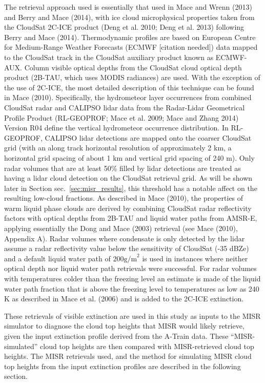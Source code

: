 The retrieval approach used is essentially that used in Mace and Wrenn
(2013) and Berry and Mace (2014), with ice cloud microphysical
properties taken from the CloudSat 2C-ICE product (Deng et al. 2010;
Deng et al. 2013) following Berry and Mace (2014). Thermodynamic
profiles are based on European Centre for Medium-Range Weather Forecasts
(ECMWF {[}citation needed{]}) data mapped to the CloudSat track in the
CloudSat auxiliary product known as ECMWF-AUX. Column visible optical
depths from the CloudSat cloud optical depth product (2B-TAU, which uses
MODIS radiances) are used. With the exception of the use of 2C-ICE, the
most detailed description of this technique can be found in Mace (2010).
Specifically, the hydrometeor layer occurrences from combined CloudSat
radar and CALIPSO lidar data from the Radar-Lidar Geometrical Profile
Product (RL-GEOPROF; Mace et al. 2009; Mace and Zhang 2014) Version R04
define the vertical hydrometeor occurrence distribution. In RL-GEOPROF,
CALIPSO lidar detections are mapped onto the coarser CloudSat grid (with
an along track horizontal resolution of approximately 2 km, a horizontal
grid spacing of about 1 km and vertical grid spacing of 240 m). Only
radar volumes that are at least 50\% filled by lidar detections are
treated as having a lidar cloud detection on the CloudSat retrieval
grid. As will be shown later in Section sec.~\ref{sec:misr_results},
this threshold has a notable affect on the resulting low-cloud
fractions. As described in Mace (2010), the properties of warm liquid
phase clouds are derived by combining CloudSat radar reflectivity
factors with optical depths from 2B-TAU and liquid water paths from
AMSR-E, applying essentially the Dong and Mace (2003) retrieval (see
Mace (2010), Appendix A). Radar volumes where condensate is only
detected by the lidar assume a radar reflectivity value below the
sensitivity of CloudSat (-35 dBZe) and a default liquid water path of
\(200 \textrm{g/m}^2\) is used in instances where neither optical depth
nor liquid water path retrievals were successful. For radar volumes with
temperatures colder than the freezing level an estimate is made of the
liquid water path fraction that is above the freezing level to
temperatures as low as 240 K as described in Mace et al. (2006) and is
added to the 2C-ICE extinction.

These retrievals of visible extinction are used in this study as inputs
to the MISR simulator to diagnose the cloud top heights that MISR would
likely retrieve, given the input extinction profile derived from the
A-Train data. These ``MISR-simulated'' cloud top heights are then
compared with MISR-retrieved cloud top heights. The MISR retrievals
used, and the method for simulating MISR cloud top heights from the
input extinction profiles are described in the following section.

